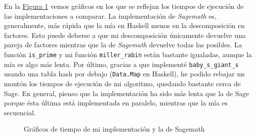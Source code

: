 \documentclass[10pt,spanish]{article}
\begin{document}
En la \hyperref[graficas]{Figura \ref*{graficas}} vemos gráficos en los que se reflejan los tiempos de ejecución de las implementaciones a comparar. La implementación de \textit{\textcolor{rojo}{Sagemath}} es, generalmente, más rápida que la mía en Haskell menos en la descomposición en factores. Esto puede deberse a que mi descomposición únicamente devuelve una pareja de factores mientras que la de \textit{\textcolor{rojo}{Sagemath}} devuelve todas las posibles. La función \texttt{is\_prime} y mi función \texttt{miller\_rabin} están bastante igualadas, aunque la mía es algo más lenta. Por último, gracias a que implementé \texttt{baby\_s\_giant\_s} usando una tabla hash por debajo (\texttt{Data.Map} en Haskell), he podido rebajar un montón los tiempos de ejecución de mi algoritmo, quedando bastante cerca de Sage. En general, pienso que la implementación ha sido más lenta que la de Sage porque ésta última está implementada en paralelo, mientras que la mía es secuencial.

\begin{figure}
    \centering
    \caption{Gráficos de tiempo de mi implementación y la de Sagemath}
    \label{graficas}
\end{figure}
\end{document}
